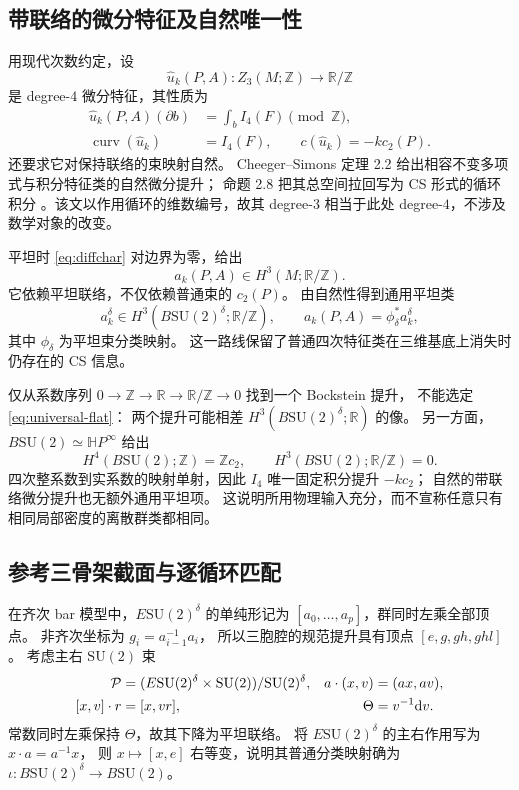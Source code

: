 \documentclass[UTF8,11pt,fontset=none]{ctexart}
\numberwithin{equation}{section}
\theoremstyle{definition}
\DeclareMathOperator{\curv}{curv}
\newcommand{\R}{\mathbb R}
\newcommand{\Z}{\mathbb Z}
\newcommand{\dd}{\mathrm d}
\newcommand{\SU}{\mathrm{SU}(2)}
\begin{document}
\subsection{带联络的微分特征及自然唯一性}

用现代次数约定，设
\[
 \widehat u_k(P,A):Z_3(M;\Z)\longrightarrow\R/\Z
\]
是 degree-$4$ 微分特征，其性质为
\begin{align}
 \widehat u_k(P,A)(\partial b)
 &=\int_bI_4(F)\pmod{\Z},\label{eq:diffchar}\\
 \curv(\widehat u_k)&=I_4(F),\qquad
 c(\widehat u_k)=-kc_2(P).
 \label{eq:diffchar-data}
\end{align}
还要求它对保持联络的束映射自然。
Cheeger--Simons 定理 2.2 给出相容不变多项式与积分特征类的自然微分提升；
命题 2.8 把其总空间拉回写为 CS 形式的循环积分
\cite{cheegersimons}。该文以作用循环的维数编号，故其 degree-$3$
相当于此处 degree-$4$，不涉及数学对象的改变。

平坦时 \eqref{eq:diffchar} 对边界为零，给出
\begin{equation}
 a_k(P,A)\in H^3(M;\R/\Z).
 \label{eq:flat-character}
\end{equation}
它依赖平坦联络，不仅依赖普通束的 $c_2(P)$。
由自然性得到通用平坦类
\begin{equation}
 a_k^\delta\in H^3(B\SU^\delta;\R/\Z),\qquad
 a_k(P,A)=\phi_\delta^*a_k^\delta,
 \label{eq:universal-flat}
\end{equation}
其中 $\phi_\delta$ 为平坦束分类映射。
这一路线保留了普通四次特征类在三维基底上消失时仍存在的 CS 信息。

仅从系数序列 $0\to\Z\to\R\to\R/\Z\to0$ 找到一个 Bockstein 提升，
不能选定 \eqref{eq:universal-flat}：
两个提升可能相差 $H^3(B\SU^\delta;\R)$ 的像。
另一方面，$B\SU\simeq\mathbb H P^\infty$ 给出
\begin{equation}
 H^4(B\SU;\Z)=\Z c_2,\qquad
 H^3(B\SU;\R/\Z)=0.
 \label{eq:universal-uniqueness}
\end{equation}
四次整系数到实系数的映射单射，因此 $I_4$ 唯一固定积分提升 $-kc_2$；
自然的带联络微分提升也无额外通用平坦项。
这说明所用物理输入充分，而不宣称任意只有相同局部密度的离散群类都相同。

\subsection{参考三骨架截面与逐循环匹配}

在齐次 bar 模型中，$E\SU^\delta$ 的单纯形记为
$[a_0,\ldots,a_p]$，群同时左乘全部顶点。
非齐次坐标为 $g_i=a_{i-1}^{-1}a_i$，
所以三胞腔的规范提升具有顶点 $[e,g,gh,ghl]$。
考虑主右 $\SU$ 束
\begin{align}
 \mathcal P&=(E\SU^\delta\times\SU)/\SU^\delta,
 &a\cdot(x,v)&=(ax,av),\label{eq:universal-bundle}\\
 [x,v]\cdot r&=[x,vr],
 &\Theta&=v^{-1}\dd v.\notag
\end{align}
常数同时左乘保持 $\Theta$，故其下降为平坦联络。
将 $E\SU^\delta$ 的主右作用写为 $x\cdot a=a^{-1}x$，
则 $x\mapsto[x,e]$ 右等变，说明其普通分类映射确为
$\iota:B\SU^\delta\to B\SU$。
\end{document}
